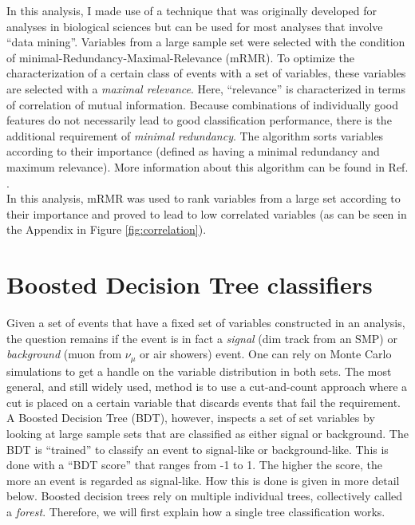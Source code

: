 In this analysis, I made use of a technique that was originally developed for analyses in biological sciences but can be used for most analyses that involve ``data mining''. Variables from a large sample set were selected with the condition of minimal-Redundancy-Maximal-Relevance (mRMR). To optimize the characterization of a certain class of events with a set of variables, these variables are selected with a \textit{maximal relevance}. Here, ``relevance'' is characterized in terms of correlation of mutual information. Because combinations of individually good features do not necessarily lead to good classification performance, there is the additional requirement of \textit{minimal redundancy}. The algorithm sorts variables according to their importance (defined as having a minimal redundancy and maximum relevance). More information about this algorithm can be found in Ref. \cite{1453511}.\\

\noindent In this analysis, mRMR was used to rank variables from a large set according to their importance and proved to lead to low correlated variables (as can be seen in the Appendix in Figure \ref{fig:correlation}).




\section{Boosted Decision Tree classifiers}
\label{sec:BDT}
Given a set of events that have a fixed set of variables constructed in an analysis, the question remains if the event is in fact a \textit{signal} (dim track from an SMP) or \textit{background} (muon from $\nu_\mu$ or air showers) event. One can rely on Monte Carlo simulations to get a handle on the variable distribution in both sets. The most general, and still widely used, method is to use a cut-and-count approach where a cut is placed on a certain variable that discards events that fail the requirement. A Boosted Decision Tree (BDT), however, inspects a set of set variables by looking at large sample sets that are classified as either signal or background. The BDT is ``trained'' to classify an event to signal-like or background-like. This is done with a ``BDT score'' that ranges from -1 to 1. The higher the score, the more an event is regarded as signal-like. How this is done is given in more detail below. Boosted decision trees rely on multiple individual trees, collectively called a \textit{forest}. Therefore, we will first explain how a single tree classification works.



